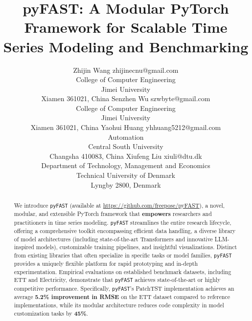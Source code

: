 \documentclass[twoside,11pt]{article}
\begin{document}
\title{pyFAST: A Modular PyTorch Framework for Scalable Time Series Modeling and Benchmarking}

\author{
    \name Zhijin Wang \email zhijinecnu@gmail.com \\
    \addr College of Computer Engineering\\
    Jimei University\\
    Xiamen 361021, China
    \AND
    \name Senzhen Wu \email szwbyte@gmail.com \\
    \addr College of Computer Engineering\\
    Jimei University\\
    Xiamen 361021, China
    \AND
    \name Yaohui Huang \email yhhuang5212@gmail.com \\
    \addr Automation\\
    Central South University\\
    Changsha 410083, China
    \AND
    \name Xiufeng Liu \email xiuli@dtu.dk \\
    \addr Department of Technology, Management and Economics\\
    Technical University of Denmark\\
    Lyngby 2800, Denmark
}



\maketitle

\begin{abstract}%
We introduce \texttt{pyFAST} (available at \url{https://github.com/freepose/pyFAST}), a novel, modular, and extensible PyTorch framework that \textbf{empowers} researchers and practitioners in time series modeling. \texttt{pyFAST} streamlines the entire research lifecycle, offering a comprehensive toolkit encompassing efficient data handling, a diverse library of model architectures (including state-of-the-art Transformers and innovative LLM-inspired models), customizable training pipelines, and insightful visualizations.  Distinct from existing libraries that often specialize in specific tasks or model families, \texttt{pyFAST} provides a uniquely flexible platform for rapid prototyping and in-depth experimentation.  Empirical evaluations on established benchmark datasets, including ETT and Electricity, demonstrate that \texttt{pyFAST} achieves state-of-the-art or highly competitive performance.  Specifically, \texttt{pyFAST}'s PatchTST implementation achieves an average \textbf{5.2\% improvement in RMSE} on the ETT dataset compared to reference implementations, while its modular architecture reduces code complexity in model customization tasks by \textbf{45\%}.
\end{abstract}
\end{document}
